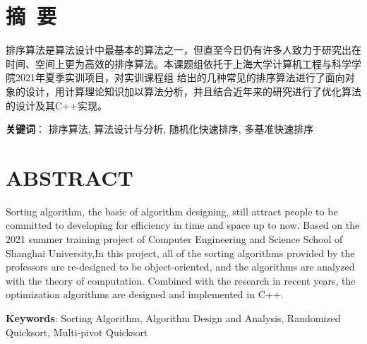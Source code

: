 \newpage

{
\let\clearpage\relax%
\centering{}

\vspace{8mm}

\chapter*{摘\ 要}
}

排序算法是算法设计中最基本的算法之一，但直至今日仍有许多人致力于研究出在时间、空间上更为高效的排序算法。本课题组依托于上海大学计算机工程与科学学院2021年夏季实训项目，对实训课程组
给出的几种常见的排序算法进行了面向对象的设计，用计算理论知识加以算法分析，并且结合近年来的研究进行了优化算法的设计及其C++实现。

\vspace{8mm}
\textbf{关键词}： 排序算法, 算法设计与分析, 随机化快速排序, 多基准快速排序

\newpage
{
\let\clearpage\relax%
\centering{}
\vspace{8mm}

\chapter*{ABSTRACT}
}

Sorting algorithm, the basic of algorithm designing, still attract people to be committed to developing for
efficiency in time and space up to now. Based on the 2021 summer training project of Computer Engineering and
Science School of Shanghai University,In this project, all of the sorting algorithms provided by the professors
are re-designed to be object-oriented, and the algorithms are analyzed with the theory of computation. Combined with
the research in recent years, the optimization algorithms are designed and implemented in C++.

\vspace{8mm}

\textbf{Keywords}: Sorting Algorithm, Algorithm Design and Analysis, Randomized Quicksort, Multi-pivot Quicksort